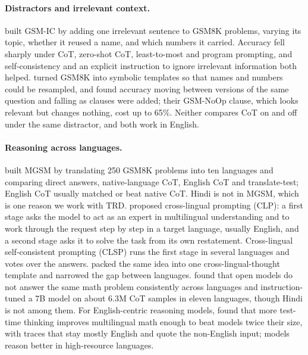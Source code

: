 \documentclass[11pt]{article}
\begin{document}
\paragraph{Distractors and irrelevant context.}
\citet{shi-etal-2023-distracted} built GSM-IC by adding one irrelevant sentence to GSM8K problems, varying its topic, whether it reused a name, and which numbers it carried. Accuracy fell sharply under CoT, zero-shot CoT, least-to-most and program prompting, and self-consistency and an explicit instruction to ignore irrelevant information both helped. \citet{mirzadeh2025gsmsymbolic} turned GSM8K into symbolic templates so that names and numbers could be resampled, and found accuracy moving between versions of the same question and falling as clauses were added; their GSM-NoOp clause, which looks relevant but changes nothing, cost up to 65\%. Neither compares CoT on and off under the same distractor, and both work in English.

\paragraph{Reasoning across languages.}
\citet{shi-etal-2023-mgsm} built MGSM by translating 250 GSM8K problems into ten languages and comparing direct answers, native-language CoT, English CoT and translate-test; English CoT usually matched or beat native CoT. Hindi is not in MGSM, which is one reason we work with TRD. \citet{qin-etal-2023-cross} proposed cross-lingual prompting (CLP): a first stage asks the model to act as an expert in multilingual understanding and to work through the request step by step in a target language, usually English, and a second stage asks it to solve the task from its own restatement. Cross-lingual self-consistent prompting (CLSP) runs the first stage in several languages and votes over the answers. \citet{huang-etal-2023-languages} packed the same idea into one cross-lingual-thought template and narrowed the gap between languages. \citet{lai-nissim-2024-mcot} found that open models do not answer the same math problem consistently across languages and instruction-tuned a 7B model on about 6.3M CoT samples in eleven languages, though Hindi is not among them. For English-centric reasoning models, \citet{yong2025crosslingual} found that more test-time thinking improves multilingual math enough to beat models twice their size, with traces that stay mostly English and quote the non-English input; models reason better in high-resource languages.
\end{document}
